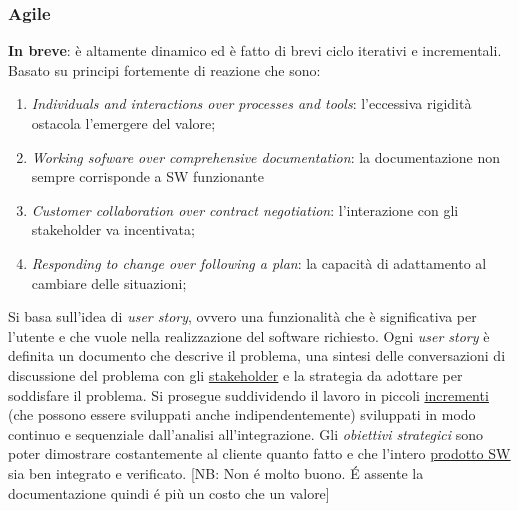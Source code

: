 			
			\subsubsection{Agile} 
			\textbf{In breve}: è altamente dinamico ed è fatto di brevi ciclo iterativi e incrementali. \\
			Basato su principi fortemente di reazione che sono:
				\begin{enumerate}
			 		\item \textit{Individuals and interactions over processes and tools}: l’eccessiva rigidità ostacola l’emergere del valore;
			 		\item \textit{Working sofware over comprehensive documentation}: la documentazione non sempre corrisponde a SW funzionante
			 		\item \textit{Customer collaboration over contract negotiation}: l’interazione con gli stakeholder va incentivata;
			 		\item \textit{Responding to change over following a plan}: la capacità di adattamento al cambiare delle situazioni;
			 	\end{enumerate}
		 	Si basa sull'idea di \textit{user story}, ovvero una funzionalità che è significativa per l'utente e che vuole nella realizzazione del software richiesto. Ogni \textit{user story} è definita un documento che descrive il problema, una sintesi delle conversazioni di discussione del problema con gli \underline{\hyperref[stakeholder]{stakeholder}} e la strategia da adottare per soddisfare il problema. Si prosegue suddividendo il lavoro in piccoli  \underline{\hyperref[incremento]{incrementi}} (che possono essere sviluppati anche indipendentemente) sviluppati in modo continuo e sequenziale dall'analisi all'integrazione. Gli \textit{obiettivi strategici} sono poter dimostrare costantemente al cliente quanto fatto e che l'intero  \underline{\hyperref[prodotto]{prodotto SW}} sia ben integrato e verificato. 
		 	[NB: Non é molto buono. É assente la documentazione quindi é più un costo che un valore]
			
